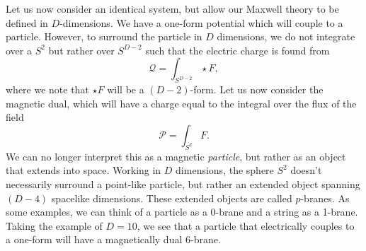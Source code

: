 Let us now consider an identical system, but allow our Maxwell theory to be defined in $D$-dimensions. We have a one-form potential which will couple to a particle. However, to surround the particle in $D$ dimensions, we do not integrate over a $S^2$ but rather over $S^{D-2}$ such that the electric charge is found from
\begin{equation*}
	\mathcal{Q} = \int_{S^{D - 2}} \star F,
\end{equation*}
where we note that $\star F$ will be a $(D-2)$-form. Let us now consider the magnetic dual, which will have a charge equal to the integral over the flux of the field
\begin{equation*}
	\mathcal{P} = \int_{S^2} F.
\end{equation*}
We can no longer interpret this as a magnetic \emph{particle}, but rather as an object that extends into space. Working in $D$ dimensions, the sphere $S^2$ doesn't necessarily surround a point-like particle, but rather an extended object spanning $(D-4)$ spacelike dimensions. These extended objects are called $p$-branes. As some examples, we can think of a particle as a 0-brane and a string as a 1-brane. Taking the example of $D = 10$, we see that a particle that electrically couples to a one-form will have a magnetically dual 6-brane.

